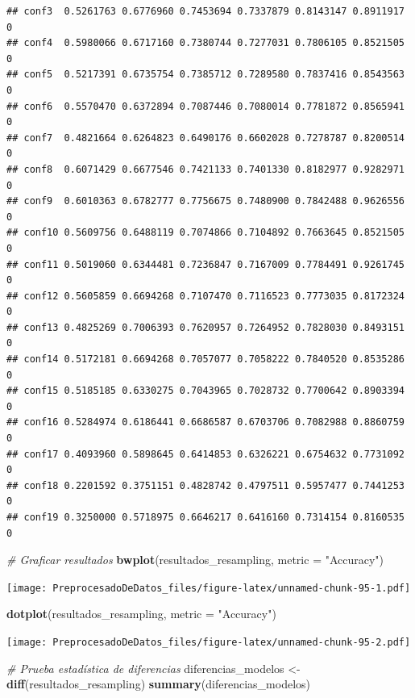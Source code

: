 \documentclass[
]{article}
\newenvironment{Shaded}{\begin{snugshade}}{\end{snugshade}}
\newcommand{\AttributeTok}[1]{\textcolor[rgb]{0.13,0.29,0.53}{#1}}
\newcommand{\CommentTok}[1]{\textcolor[rgb]{0.56,0.35,0.01}{\textit{#1}}}
\newcommand{\FunctionTok}[1]{\textcolor[rgb]{0.13,0.29,0.53}{\textbf{#1}}}
\newcommand{\NormalTok}[1]{#1}
\newcommand{\OtherTok}[1]{\textcolor[rgb]{0.56,0.35,0.01}{#1}}
\newcommand{\StringTok}[1]{\textcolor[rgb]{0.31,0.60,0.02}{#1}}
\begin{document}
\begin{verbatim}
## conf3  0.5261763 0.6776960 0.7453694 0.7337879 0.8143147 0.8911917    0
## conf4  0.5980066 0.6717160 0.7380744 0.7277031 0.7806105 0.8521505    0
## conf5  0.5217391 0.6735754 0.7385712 0.7289580 0.7837416 0.8543563    0
## conf6  0.5570470 0.6372894 0.7087446 0.7080014 0.7781872 0.8565941    0
## conf7  0.4821664 0.6264823 0.6490176 0.6602028 0.7278787 0.8200514    0
## conf8  0.6071429 0.6677546 0.7421133 0.7401330 0.8182977 0.9282971    0
## conf9  0.6010363 0.6782777 0.7756675 0.7480900 0.7842488 0.9626556    0
## conf10 0.5609756 0.6488119 0.7074866 0.7104892 0.7663645 0.8521505    0
## conf11 0.5019060 0.6344481 0.7236847 0.7167009 0.7784491 0.9261745    0
## conf12 0.5605859 0.6694268 0.7107470 0.7116523 0.7773035 0.8172324    0
## conf13 0.4825269 0.7006393 0.7620957 0.7264952 0.7828030 0.8493151    0
## conf14 0.5172181 0.6694268 0.7057077 0.7058222 0.7840520 0.8535286    0
## conf15 0.5185185 0.6330275 0.7043965 0.7028732 0.7700642 0.8903394    0
## conf16 0.5284974 0.6186441 0.6686587 0.6703706 0.7082988 0.8860759    0
## conf17 0.4093960 0.5898645 0.6414853 0.6326221 0.6754632 0.7731092    0
## conf18 0.2201592 0.3751151 0.4828742 0.4797511 0.5957477 0.7441253    0
## conf19 0.3250000 0.5718975 0.6646217 0.6416160 0.7314154 0.8160535    0
\end{verbatim}

\begin{Shaded}
\begin{Highlighting}[]
\CommentTok{\# Graficar resultados}
\FunctionTok{bwplot}\NormalTok{(resultados\_resampling, }\AttributeTok{metric =} \StringTok{"Accuracy"}\NormalTok{)}
\end{Highlighting}
\end{Shaded}

\texttt{[image: PreprocesadoDeDatos\_files/figure-latex/unnamed-chunk-95-1.pdf]}

\begin{Shaded}
\begin{Highlighting}[]
\FunctionTok{dotplot}\NormalTok{(resultados\_resampling, }\AttributeTok{metric =} \StringTok{"Accuracy"}\NormalTok{)}
\end{Highlighting}
\end{Shaded}

\texttt{[image: PreprocesadoDeDatos\_files/figure-latex/unnamed-chunk-95-2.pdf]}

\begin{Shaded}
\begin{Highlighting}[]
\CommentTok{\# Prueba estadística de diferencias}
\NormalTok{diferencias\_modelos }\OtherTok{\textless{}{-}} \FunctionTok{diff}\NormalTok{(resultados\_resampling)}
\FunctionTok{summary}\NormalTok{(diferencias\_modelos)}
\end{Highlighting}
\end{Shaded}
\end{document}
